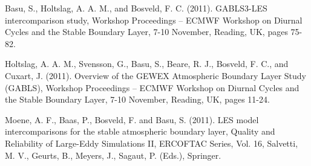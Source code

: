 \begin{etaremune}[topsep=0pt,itemsep=0pt,partopsep=0pt,parsep=0pt]
\item Basu, S., Holtslag, A. A. M., and Bosveld, F. C. (2011). GABLS3-LES intercomparison study, Workshop Proceedings – ECMWF Workshop on Diurnal Cycles and the Stable Boundary Layer, 7-10 November, Reading, UK, pages 75-82. 

\item Holtslag, A. A. M., Svensson, G., Basu, S., Beare, R. J., Bosveld, F. C., and Cuxart, J. (2011). Overview of the GEWEX Atmospheric Boundary Layer Study (GABLS), Workshop Proceedings – ECMWF Workshop on Diurnal Cycles and the Stable Boundary Layer, 7-10 November, Reading, UK, pages 11-24.

\item Moene, A. F., Baas, P., Bosveld, F. and Basu, S. (2011). LES model intercomparisons for the stable atmospheric boundary layer, Quality and Reliability of Large-Eddy Simulations II, ERCOFTAC Series, Vol. 16, Salvetti, M. V., Geurts, B., Meyers, J., Sagaut, P. (Eds.), Springer.  

\end{etaremune}
